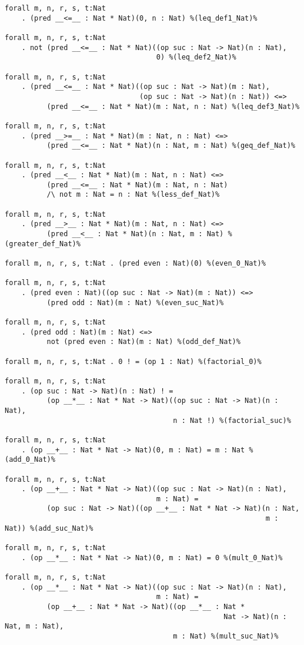 \documentclass[11pt,a4paper]{article}
\begin{document}
\begin{verbatim}
forall m, n, r, s, t:Nat
    . (pred __<=__ : Nat * Nat)(0, n : Nat) %(leq_def1_Nat)%

forall m, n, r, s, t:Nat
    . not (pred __<=__ : Nat * Nat)((op suc : Nat -> Nat)(n : Nat),
                                    0) %(leq_def2_Nat)%

forall m, n, r, s, t:Nat
    . (pred __<=__ : Nat * Nat)((op suc : Nat -> Nat)(m : Nat),
                                (op suc : Nat -> Nat)(n : Nat)) <=>
          (pred __<=__ : Nat * Nat)(m : Nat, n : Nat) %(leq_def3_Nat)%

forall m, n, r, s, t:Nat
    . (pred __>=__ : Nat * Nat)(m : Nat, n : Nat) <=>
          (pred __<=__ : Nat * Nat)(n : Nat, m : Nat) %(geq_def_Nat)%

forall m, n, r, s, t:Nat
    . (pred __<__ : Nat * Nat)(m : Nat, n : Nat) <=>
          (pred __<=__ : Nat * Nat)(m : Nat, n : Nat)
          /\ not m : Nat = n : Nat %(less_def_Nat)%

forall m, n, r, s, t:Nat
    . (pred __>__ : Nat * Nat)(m : Nat, n : Nat) <=>
          (pred __<__ : Nat * Nat)(n : Nat, m : Nat) %(greater_def_Nat)%

forall m, n, r, s, t:Nat . (pred even : Nat)(0) %(even_0_Nat)%

forall m, n, r, s, t:Nat
    . (pred even : Nat)((op suc : Nat -> Nat)(m : Nat)) <=>
          (pred odd : Nat)(m : Nat) %(even_suc_Nat)%

forall m, n, r, s, t:Nat
    . (pred odd : Nat)(m : Nat) <=>
          not (pred even : Nat)(m : Nat) %(odd_def_Nat)%

forall m, n, r, s, t:Nat . 0 ! = (op 1 : Nat) %(factorial_0)%

forall m, n, r, s, t:Nat
    . (op suc : Nat -> Nat)(n : Nat) ! =
          (op __*__ : Nat * Nat -> Nat)((op suc : Nat -> Nat)(n : Nat),
                                        n : Nat !) %(factorial_suc)%

forall m, n, r, s, t:Nat
    . (op __+__ : Nat * Nat -> Nat)(0, m : Nat) = m : Nat %(add_0_Nat)%

forall m, n, r, s, t:Nat
    . (op __+__ : Nat * Nat -> Nat)((op suc : Nat -> Nat)(n : Nat),
                                    m : Nat) =
          (op suc : Nat -> Nat)((op __+__ : Nat * Nat -> Nat)(n : Nat,
                                                              m : Nat)) %(add_suc_Nat)%

forall m, n, r, s, t:Nat
    . (op __*__ : Nat * Nat -> Nat)(0, m : Nat) = 0 %(mult_0_Nat)%

forall m, n, r, s, t:Nat
    . (op __*__ : Nat * Nat -> Nat)((op suc : Nat -> Nat)(n : Nat),
                                    m : Nat) =
          (op __+__ : Nat * Nat -> Nat)((op __*__ : Nat *
                                                    Nat -> Nat)(n : Nat, m : Nat),
                                        m : Nat) %(mult_suc_Nat)%


\end{verbatim}
\end{document}
